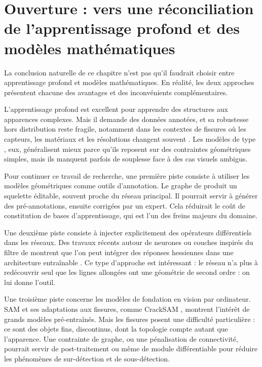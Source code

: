 \section{Ouverture : vers une réconciliation de l'apprentissage profond et des modèles mathématiques}
\label{sec:chapIII_ouverture_dl_modeles}

La conclusion naturelle de ce chapitre n'est pas qu'il faudrait choisir entre apprentissage profond et modèles mathématiques. En réalité, les deux approches présentent chacune des avantages et des inconvénients complémentaires.

L'apprentissage profond est excellent pour apprendre des structures aux apparences complexes. Mais il demande des données annotées, et sa robustesse hors distribution reste fragile, notamment dans les contextes de fissures où les capteurs, les matériaux et les résolutions changent souvent \cite{Zhang2025Review}. Les modèles de type \Frangi{}, eux, généralisent mieux parce qu'ils reposent sur des contraintes géométriques simples, mais ils manquent parfois de souplesse face à des cas visuels ambigus.

Pour continuer ce travail de recherche, une première piste consiste à utiliser les modèles géométriques comme outils d'annotation. Le graphe de \Frangi{} produit un squelette éditable, souvent proche du réseau principal. Il pourrait servir à générer des pré-annotations, ensuite corrigées par un expert. Cela réduirait le coût de constitution de bases d'apprentissage, qui est l'un des freins majeurs du domaine.

Une deuxième piste consiste à injecter explicitement des opérateurs différentiels dans les réseaux. Des travaux récents autour de neurones ou couches inspirés du filtre de \Frangi{} montrent que l'on peut intégrer des réponses hessiennes dans une architecture entraînable \cite{NeuroneFrangi2023}. Ce type d'approche est intéressant : le réseau n'a plus à redécouvrir seul que les lignes allongées ont une géométrie de second ordre : on lui donne l'outil.

Une troisième piste concerne les modèles de fondation en vision par ordinateur. SAM \cite{Kirillov2023SAM} et ses adaptations aux fissures, comme CrackSAM \cite{Ge2024CrackSAM}, montrent l'intérêt de grands modèles pré-entraînés. Mais les fissures posent une difficulté particulière : ce sont des objets fins, discontinus, dont la topologie compte autant que l'apparence. Une contrainte de graphe, ou une pénalisation de connectivité, pourrait servir de post-traitement ou même de module différentiable pour réduire les phénomènes de sur-détection et de sous-détection.

